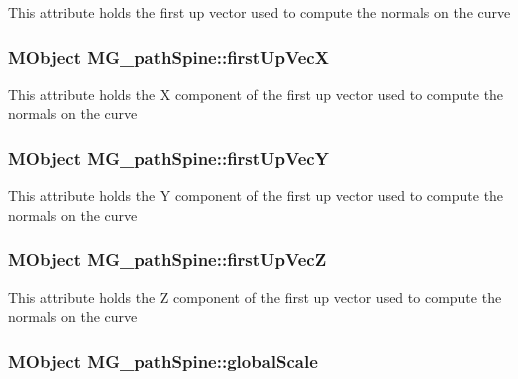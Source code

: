 This attribute holds the first up vector used to compute the normals on the curve \hypertarget{class_m_g__path_spine_aba3135fe0e05c181f1123510fec9118d}{
\subsubsection[{first\-Up\-Vec\-X}]{\setlength{\rightskip}{0pt plus 5cm}M\-Object M\-G\-\_\-path\-Spine\-::first\-Up\-Vec\-X\hspace{0.3cm}{\ttfamily [static]}}}\label{class_m_g__path_spine_aba3135fe0e05c181f1123510fec9118d}
This attribute holds the X component of the first up vector used to compute the normals on the curve \hypertarget{class_m_g__path_spine_a681e0163d082d9e5b9ba0362b45ac58c}{
\subsubsection[{first\-Up\-Vec\-Y}]{\setlength{\rightskip}{0pt plus 5cm}M\-Object M\-G\-\_\-path\-Spine\-::first\-Up\-Vec\-Y\hspace{0.3cm}{\ttfamily [static]}}}\label{class_m_g__path_spine_a681e0163d082d9e5b9ba0362b45ac58c}
This attribute holds the Y component of the first up vector used to compute the normals on the curve \hypertarget{class_m_g__path_spine_aae8d7d46c33e1da9fae50fc557fa7b71}{
\subsubsection[{first\-Up\-Vec\-Z}]{\setlength{\rightskip}{0pt plus 5cm}M\-Object M\-G\-\_\-path\-Spine\-::first\-Up\-Vec\-Z\hspace{0.3cm}{\ttfamily [static]}}}\label{class_m_g__path_spine_aae8d7d46c33e1da9fae50fc557fa7b71}
This attribute holds the Z component of the first up vector used to compute the normals on the curve \hypertarget{class_m_g__path_spine_a2b442386812642012d95aecacc5939c1}{
\subsubsection[{global\-Scale}]{\setlength{\rightskip}{0pt plus 5cm}M\-Object M\-G\-\_\-path\-Spine\-::global\-Scale\hspace{0.3cm}{\ttfamily [static]}}}\label{class_m_g__path_spine_a2b442386812642012d95aecacc5939c1}
